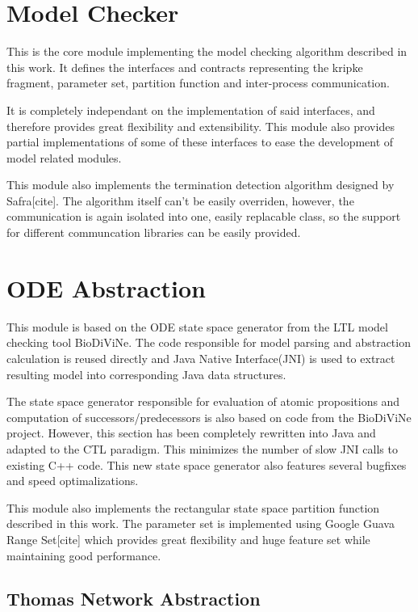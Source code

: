 \documentclass[12pt,oneside, draft]{fithesis2}
\begin{document}
		\section{Model Checker}
			
			This is the core module implementing the model checking algorithm described in this work. It defines the interfaces and contracts representing the kripke fragment, parameter set, partition function and inter-process communication.
				
			It is completely independant on the implementation of said interfaces, and therefore provides great flexibility and extensibility. This module also provides partial implementations of some of these interfaces to ease the development of model related modules. 
				
			This module also implements the termination detection algorithm designed by Safra[cite]. The algorithm itself can't be easily overriden, however, the communication is again isolated into one, easily replacable class, so the support for different communcation libraries can be easily provided.
	
		\section{ODE Abstraction}
			
			This module is based on the ODE state space generator from the LTL model checking tool BioDiViNe. The code responsible for model parsing and abstraction calculation is reused directly and Java Native Interface(JNI) is used to extract resulting model into corresponding Java data structures.
				
			The state space generator responsible for evaluation of atomic propositions and computation of successors/predecessors is also based on code from the BioDiViNe project. However, this section has been completely rewritten into Java and adapted to the CTL paradigm. This minimizes the number of slow JNI calls to existing C++ code. This new state space generator also features several bugfixes and speed optimalizations.
				
			This module also implements the rectangular state space partition function described in this work. The parameter set is implemented using Google Guava Range Set[cite] which provides great flexibility and huge feature set while maintaining good performance.
				
		\subsection{Thomas Network Abstraction}
\end{document}
